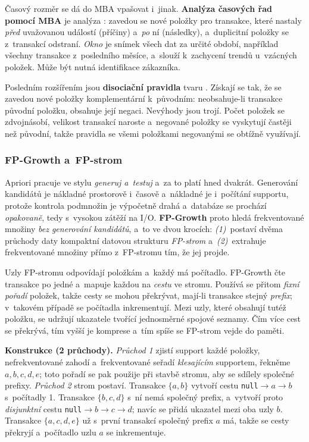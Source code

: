 \documentclass[11pt,a4paper]{article}
\theoremstyle{definition}
\begin{document}
Časový rozměr se dá do MBA vpašovat i~jinak. \textbf{Analýza časových řad pomocí MBA} je
analýza : zavedou se nové položky pro transakce, které nastaly
\emph{před} uvažovanou událostí (příčiny) a~\emph{po} ní (následky), a~duplicitní položky se
z~transakcí odstraní. \emph{Okno} je snímek všech dat za určité období, například všechny
transakce z~posledního měsíce, a~slouží k~zachycení trendů u~vzácných položek. Může být nutná
identifikace zákazníka.

Posledním rozšířením jsou \textbf{disociační pravidla} tvaru . Získají se tak, že se zavedou nové položky komplementární k~původním: neobsahuje-li
transakce původní položku, obsahuje její negaci. Nevýhody jsou trojí. Počet položek se
zdvojnásobí, velikost transakcí naroste a~negované položky se vyskytují častěji než původní,
takže pravidla se všemi položkami negovanými se obtížně využívají.

\subsubsection{FP-Growth a~FP-strom}

Apriori pracuje ve stylu \emph{generuj a~testuj} a~za to platí hned dvakrát. Generování
kandidátů je nákladné prostorově i~časově a~nákladné je i~počítání supportu, protože kontrola
podmnožin je výpočetně drahá a~databáze se prochází \emph{opakovaně}, tedy s~vysokou zátěží
na I/O. \textbf{FP-Growth} proto hledá frekventované množiny \emph{bez generování kandidátů},
a~to ve dvou krocích: \emph{(1)}~postaví dvěma průchody daty kompaktní datovou strukturu
\emph{FP-strom} a~\emph{(2)}~extrahuje frekventované množiny přímo z~FP-stromu tím, že jej
projde.

\begin{defbox}[FP-strom]
Uzly FP-stromu odpovídají položkám a~každý má počítadlo. FP-Growth čte transakce po jedné
a~mapuje každou na \emph{cestu} ve stromu. Používá se přitom \emph{fixní pořadí} položek,
takže cesty se mohou překrývat, mají-li transakce stejný \emph{prefix}; v~takovém případě se
počítadla inkrementují. Mezi uzly, které obsahují tutéž položku, se udržují ukazatele tvořící
jednosměrné spojové seznamy. Čím více cest se překrývá, tím vyšší je komprese a~tím spíše se
FP-strom vejde do paměti.
\end{defbox}

\textbf{Konstrukce (2 průchody).} \emph{Průchod 1} zjistí support každé položky, nefrekventované
zahodí a~frekventované seřadí \emph{klesajícím} supportem, řekněme $a,b,c,d,e$; toto pořadí se
pak použije při stavbě stromu, aby se sdílely společné prefixy. \emph{Průchod 2} strom
postaví. Transakce $\{a,b\}$ vytvoří cestu \texttt{null}$\to a\to b$ s~počítadly 1. Transakce
$\{b,c,d\}$ s~ní nemá společný prefix, a~vytvoří proto \emph{disjunktní} cestu
\texttt{null}$\to b\to c\to d$; navíc se přidá ukazatel mezi oba uzly $b$. Transakce
$\{a,c,d,e\}$ už s~první transakcí společný prefix $a$ má, takže se cesty překryjí
a~počítadlo uzlu $a$ se inkrementuje.
\end{document}
